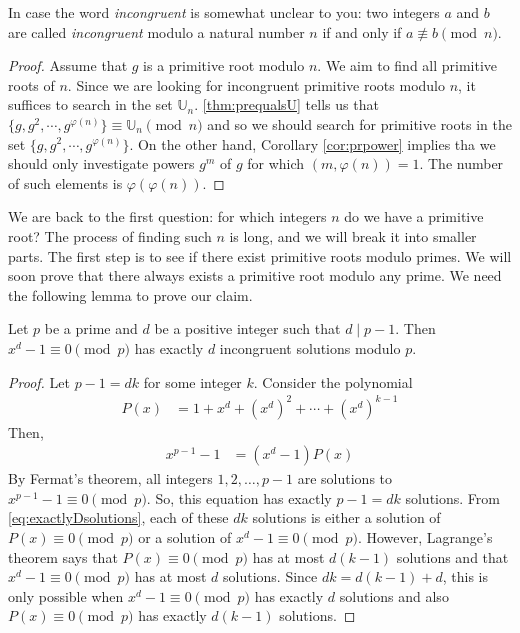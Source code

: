 \begin{note}
	In case the word \textit{incongruent} is somewhat unclear to you: two integers $a$ and $b$ are called \textit{incongruent} modulo a natural number $n$ if and only if $a \not \equiv b \pmod n$.
\end{note}

\begin{proof}
	Assume that $g$ is a primitive root modulo $n$. We aim to find all primitive roots of $n$. Since we are looking for incongruent primitive roots modulo $n$, it suffices to search in the set $\mathbb U_n$. \autoref{thm:prequalsU} tells us that $\{g,g^2,\cdots,g^{\varphi(n)}\} \equiv \mathbb U_n \pmod n$ and so we should search for primitive roots in the set $\{g,g^2,\cdots,g^{\varphi(n)}\}$. On the other hand, Corollary \ref{cor:prpower} implies tha we should only investigate powers $g^m$ of $g$ for which $(m, \varphi(n))=1$. The number of such elements is $\varphi(\varphi(n))$.
\end{proof}

We are back to the first question: for which integers $n$ do we have a primitive root? The process of finding such $n$ is long, and we will break it into smaller parts. The first step is to see if there exist primitive roots modulo primes. We will soon prove that there always exists a primitive root modulo any prime. We need the following lemma to prove our claim.

\begin{lemma}\label{lem:exactlyDsolutions}
	Let $p$ be a prime and $d$ be a positive integer such that $d \mid p-1$. Then $x^d -1 \equiv 0 \pmod p$ has exactly $d$ incongruent solutions modulo $p$.
\end{lemma}

\begin{proof}
	Let $p-1=dk$ for some integer $k$. Consider the polynomial
		\begin{align*}
			P(x)
				& = 1+x^d + \left(x^d\right)^2 + \cdots + \left(x^d\right)^{k-1}
		\end{align*}
	Then,
		\begin{align}\label{eq:exactlyDsolutions}
			x^{p-1} -1
				& = (x^d-1)P(x)
		\end{align}
	By Fermat's theorem, all integers $1, 2, \ldots, p-1$ are solutions to $x^{p-1}-1 \equiv 0 \pmod p$. So, this equation has exactly $p-1=dk$ solutions. From \eqref{eq:exactlyDsolutions}, each of these $dk$ solutions is either a solution of $P(x) \equiv 0 \pmod p$ or a solution of $x^d-1 \equiv 0 \pmod p$. However, Lagrange's theorem says that $P(x) \equiv 0 \pmod p$ has at most $d(k-1)$ solutions and that $x^d-1 \equiv 0 \pmod p$ has at most $d$ solutions. Since $dk=d(k-1)+d$, this is only possible when $x^d-1 \equiv 0 \pmod p$ has exactly $d$ solutions and also $P(x) \equiv 0 \pmod p$ has exactly $d(k-1)$ solutions.
\end{proof}

